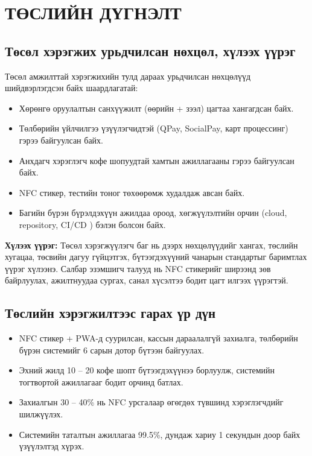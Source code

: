 \chapter{ТӨСЛИЙН ДҮГНЭЛТ}

\section{Төсөл хэрэгжих урьдчилсан нөхцөл, хүлээх үүрэг}

Төсөл амжилттай хэрэгжихийн тулд дараах урьдчилсан нөхцөлүүд
шийдвэрлэгдсэн байх шаардлагатай:

\begin{itemize}
  \item Хөрөнгө оруулалтын санхүүжилт (өөрийн + зээл) цагтаа
        хангагдсан байх.
  \item Төлбөрийн үйлчилгээ үзүүлэгчидтэй (QPay, SocialPay, карт
        процессинг) гэрээ байгуулсан байх.
  \item Анхдагч хэрэглэгч кофе шопуудтай хамтын ажиллагааны
        гэрээ байгуулсан байх.
  \item NFC стикер, тестийн тоног төхөөрөмж худалдаж авсан байх.
  \item Багийн бүрэн бүрэлдэхүүн ажилдаа ороод, хөгжүүлэлтийн орчин
        (cloud, repository, CI/CD \cite{githubactions}) бэлэн болсон байх.
\end{itemize}

\noindent\textbf{Хүлээх үүрэг:} Төсөл хэрэгжүүлэгч баг нь дээрх
нөхцөлүүдийг хангах, төслийн хугацаа, төсвийн дагуу гүйцэтгэх,
бүтээгдэхүүний чанарын стандартыг баримтлах үүрэг хүлээнэ. Салбар
эзэмшигч талууд нь NFC стикерийг ширээнд зөв байрлуулах, ажилтнуудаа
сургах, санал хүсэлтээ бодит цагт илгээх үүрэгтэй.

\section{Төслийн хэрэгжилтээс гарах үр дүн}

\begin{itemize}
  \item NFC стикер + PWA-д суурилсан, кассын дараалалгүй захиалга,
        төлбөрийн бүрэн системийг 6 сарын дотор бүтээн байгуулах.
  \item Эхний жилд 10 -- 20 кофе шопт бүтээгдэхүүнээ борлуулж,
        системийн тогтвортой ажиллагааг бодит орчинд батлах.
  \item Захиалгын 30 -- 40\% нь NFC урсгалаар өгөгдөх түвшинд
        хэрэглэгчдийг шилжүүлэх.
  \item Системийн таталтын ажиллагаа 99.5\%, дундаж хариу 1 секундын
        доор байх үзүүлэлтэд хүрэх.
\end{itemize}

